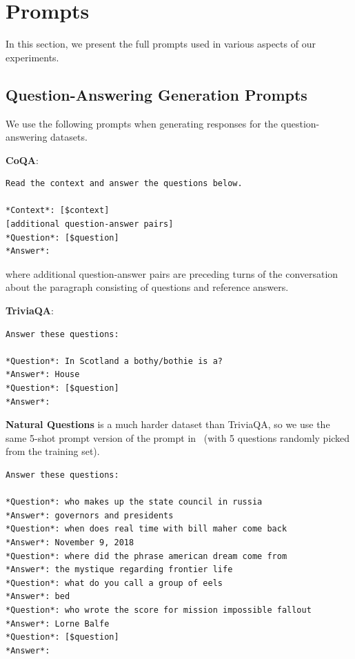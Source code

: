 \section{Prompts}\label{appendix:prompt}
In this section, we present the full prompts used in various aspects of our experiments.

\subsection{Question-Answering Generation Prompts}
We use the following prompts when generating responses for the question-answering datasets.


\textbf{CoQA}:
\begin{lstlisting}[basicstyle=\footnotesize\ttfamily]
Read the context and answer the questions below.

*Context*: [$context]
[additional question-answer pairs]
*Question*: [$question]
*Answer*:
\end{lstlisting}
where additional question-answer pairs are preceding turns of the conversation about the paragraph consisting of questions and reference answers.


\textbf{TriviaQA}:
\begin{lstlisting}[basicstyle=\footnotesize\ttfamily]
Answer these questions:

*Question*: In Scotland a bothy/bothie is a?
*Answer*: House
*Question*: [$question]
*Answer*:
\end{lstlisting}


\textbf{Natural Questions} is a much harder dataset than TriviaQA, so we use the same 5-shot prompt version of the prompt in~\cite{touvron2023llama} (with 5 questions randomly picked from the training set).
\begin{lstlisting}[basicstyle=\footnotesize\ttfamily]
Answer these questions:

*Question*: who makes up the state council in russia
*Answer*: governors and presidents
*Question*: when does real time with bill maher come back
*Answer*: November 9, 2018
*Question*: where did the phrase american dream come from
*Answer*: the mystique regarding frontier life
*Question*: what do you call a group of eels
*Answer*: bed
*Question*: who wrote the score for mission impossible fallout
*Answer*: Lorne Balfe
*Question*: [$question]
*Answer*:
\end{lstlisting}

